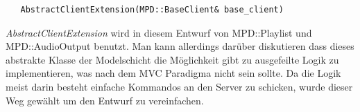\begin{verbatim}
   AbstractClientExtension(MPD::BaseClient& base_client)
\end{verbatim}

\emph{AbstractClientExtension} wird in diesem Entwurf von MPD::Playlist und MPD::AudioOutput benutzt.
Man kann allerdings darüber diskutieren dass dieses abstrakte Klasse der Modelschicht die Möglichkeit gibt zu ausgefeilte Logik zu implementieren, was nach dem MVC Paradigma nicht sein sollte.  
Da die Logik meist darin besteht einfache Kommandos an den Server zu schicken, wurde dieser Weg gewählt um 
den Entwurf zu vereinfachen.


